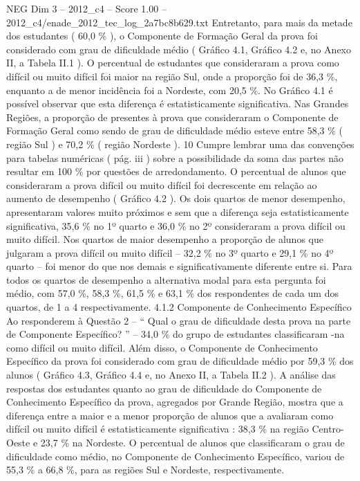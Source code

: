 \begin{textsample}{NEG Dim 3 – 2012\_c4 – Score 1.00 – 2012\_c4/enade\_2012\_tec\_log\_2a7bc8b629.txt}
Entretanto, para mais da metade dos estudantes ( 60,0 \% ), o Componente de Formação Geral da prova foi considerado com grau de dificuldade médio ( Gráfico 4.1, Gráfico 4.2 e, no Anexo II, a Tabela II.1 ).
O percentual de estudantes que consideraram a prova como difícil ou muito difícil foi maior na região Sul, onde a proporção foi de 36,3 \%, enquanto a de menor incidência foi a Nordeste, com 20,5 \%.
No Gráfico 4.1 é possível observar que esta diferença é estatisticamente significativa.
Nas Grandes Regiões, a proporção de presentes à prova que consideraram o Componente de Formação Geral como sendo de grau de dificuldade médio esteve entre 58,3 \% ( região Sul ) e 70,2 \% ( região Nordeste ). 10 Cumpre lembrar uma das convenções para tabelas numéricas ( pág. iii ) sobre a possibilidade da soma das partes não resultar em 100 \% por questões de arredondamento.
O percentual de alunos que consideraram a prova difícil ou muito difícil foi decrescente em relação ao aumento de desempenho ( Gráfico 4.2 ).
Os dois quartos de menor desempenho, apresentaram valores muito próximos e sem que a diferença seja estatisticamente significativa, 35,6 \% no 1º quarto e 36,0 \% no 2º consideraram a prova difícil ou muito difícil.
Nos quartos de maior desempenho a proporção de alunos que julgaram a prova difícil ou muito difícil – 32,2 \% no 3º quarto e 29,1 \% no 4º quarto – foi menor do que nos demais e significativamente diferente entre si.
Para todos os quartos de desempenho a alternativa modal para esta pergunta foi médio, com 57,0 \%, 58,3 \%, 61,5 \% e 63,1 \% dos respondentes de cada um dos quartos, de 1 a 4 respectivamente. 4.1.2 Componente de Conhecimento Específico Ao responderem à Questão 2 – “ Qual o grau de dificuldade desta prova na parte de Componente Específico? ” – 34,0 \% do grupo de estudantes classificaram -na como difícil ou muito difícil.
Além disso, o Componente de Conhecimento Específico da prova foi considerado com grau de dificuldade médio por 59,3 \% dos alunos ( Gráfico 4.3, Gráfico 4.4 e, no Anexo II, a Tabela II.2 ).
A análise das respostas dos estudantes quanto ao grau de dificuldade do Componente de Conhecimento Específico da prova, agregados por Grande Região, mostra que a diferença entre a maior e a menor proporção de alunos que a avaliaram como difícil ou muito difícil é estatisticamente significativa : 38,3 \% na região Centro-Oeste e 23,7 \% na Nordeste.
O percentual de alunos que classificaram o grau de dificuldade como médio, no Componente de Conhecimento Específico, variou de 55,3 \% a 66,8 \%, para as regiões Sul e Nordeste, respectivamente.

\end{textsample}
